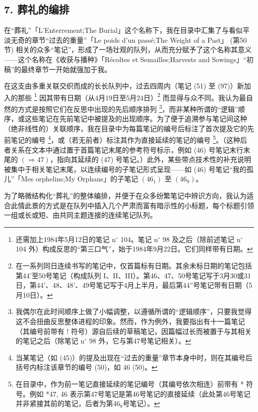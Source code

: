 \subsection{7. 葬礼的编排}

在“葬礼”「L'Enterrement;The Burial」这个名称下，我在目录中汇集了与看似平淡无奇的章节“过去的重量”「Le poids d'un passé;The Weight of a Past」 (第50节) 相关的众多“笔记”，形成了一场壮观的队列，从而充分赋予了这个名称其意义——这个名称在《收获与播种》「Récoltes et Semailles;Harvests and Sowings」“初稿”的最终章节一开始就强加于我。

在这支由多重关联交织而成的长长队列中，过去四周内（笔记 (51) 至 (97)）新加入的那些 \footnote{还需加上1984年5月12日的笔记 $\mathrm{n}^{\circ}$ 104。笔记 $\mathrm{n}^{\circ}$ 98 及之后（除前述笔记 $\mathrm{n}^{\circ}$ 104 外）构成反思的“第三口气”，始于1984年9月22日。它们同样带有日期。} 因其带有日期（从4月19日至5月24日）\footnote{在一系列同日连续书写的笔记中，仅首篇标有日期。其余未标日期的笔记包括第44'至50号笔记（构成队列 I、II、III）。第46、47、50号笔记写于3月30或31日，第44'、48、48'、49号笔记写于4月上半月，最后第44''号笔记带有日期（5月10日）。} 而显得与众不同。我认为最自然的方式是按照它们在反思中出现的先后顺序排列 \footnote{我偶尔在此时间顺序上做了小幅调整，以遵循所谓的“逻辑顺序”，只要我觉得这不会扭曲反思整体进程的印象。然而，作为例外，我要指出有十一篇笔记（其编号前带有 ! 符号）源自后续的草稿笔记，因篇幅过长而被置于与其相关的笔记之后（除笔记 $\mathrm{n}^{\circ}$ 98 外，它与第47号笔记相关）。}，而非某种所谓的“逻辑”顺序，或这些笔记在先前笔记中被提及的出现顺序。为了便于追溯参与笔记间这种（绝非线性的）关联顺序，我在目录中为每篇笔记的编号后标注了首次提及它的先前笔记的编号 \footnote{当某笔记（如 (45)）的提及出现在“过去的重量”章节本身中时，则在其编号后括号内标注该章节的编号 (50)，如 46 (50)。}，或（若无前者）标注其作为直接延续的笔记的编号 \footnote{在目录中，作为前一笔记直接延续的笔记编号（其编号依次相连）前带有 * 符号。例如 *47, 46 表示第47号笔记是第46号笔记的直接延续（此处第46号笔记并非紧接其前的笔记，后者为第46$_9$号笔记）。}。（这种后者关系在文本中通过置于首篇笔记末尾的参考符号标示，例如 (46) 号笔记末行末尾的 $(\Rightarrow 47)$，指向其延续的 (47) 号笔记。）此外，某些带点技术性的补充说明被集中于相关笔记末尾，以连续编号的子笔记形式呈现——如 (46) 号笔记“我的孤儿”「Mes orphelins;My Orphans」的子笔记 $\left(46_{1}\right)$ 至 $\left(46_{9}\right)$。

为了略微结构化“葬礼”的整体编排，并便于在众多纷繁笔记中辨识方向，我认为适合此情此景的方式是在队列中插入几个严肃而富有暗示性的小标题，每个标题引领一组或长或短、由共同主题连接的连续笔记队列。

